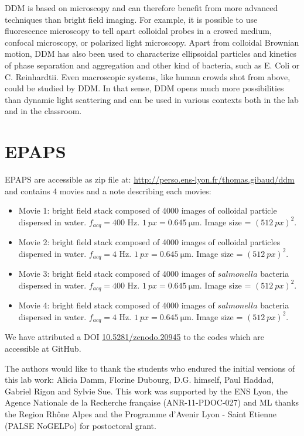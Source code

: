 \documentclass[prb,reprint,amsmath,amssymb]{revtex4-1}
\newcommand{\tg}[1]{{\color{magenta}#1}} %
\begin{document}
DDM is based  on microscopy and can therefore benefit from  more advanced techniques than bright field imaging. For example, it is possible to use fluorescence microscopy to tell apart colloidal probes in a crowed medium\cite{Hendricks2015}, confocal microscopy\cite{Lu2012}, or polarized light microscopy\citep{20_reufer2012differential}. Apart from colloidal Brownian motion, DDM has also been used to characterize ellipsoidal particles\citep{20_reufer2012differential} and kinetics of phase separation\cite{Gao2015} and aggregation\cite{Ferri2011} \tg{and other kind of bacteria, such as E. Coli or C. Reinhardtii\cite{4_Martinez20121637}}. Even macroscopic systems, like human crowds shot from above, could be studied by DDM. In that sense, DDM opens much more possibilities than dynamic light scattering and can be used in various contexts both in the lab and in the classroom.

\section*{EPAPS}
\label{sec:epaps}
EPAPS are accessible as zip file at: \url{http://perso.ens-lyon.fr/thomas.gibaud/ddm} and  contains 4 movies and a note describing each movies:
\begin{itemize}
 \item Movie 1: bright field stack composed of 4000 images of colloidal particle dispersed in water. $f_{acq}=400$ Hz. $\SI{1}{px} = \SI{0.645}{\micro\meter}$. Image size = $(\SI{512}{px})^2$.
 \item Movie 2: bright field stack composed of 4000 images of colloidal particles dispersed in water. $f_{acq}=4$ Hz. $\SI{1}{px} = \SI{0.645}{\micro\meter}$. Image size = $(\SI{512}{px})^2$.
 \item Movie 3: bright field stack composed of 4000 images of $salmonella$ bacteria dispersed in water. $f_{acq}=400$ Hz. $\SI{1}{px} = \SI{0.645}{\micro\meter}$. Image size = $(\SI{512}{px})^2$.
 \item Movie 4: bright field stack composed of 4000 images of $salmonella$ bacteria dispersed in water. $f_{acq}=4$ Hz. $\SI{1}{px} = \SI{0.645}{\micro\meter}$. Image size = $(\SI{512}{px})^2$.
\end{itemize}

We have attributed a DOI \href{http://dx.doi.org/10.5281/zenodo.20945}{10.5281/zenodo.20945}\cite{code_github} to the codes which are accessible at GitHub.


\begin{acknowledgments}
The authors would like to thank the students who endured the initial versions of this lab work: Alicia Damm, Florine Dubourg, D.G. himself, Paul Haddad, Gabriel Rigon and Sylvie Sue. 
This work was supported by the ENS Lyon, the Agence Nationale de la Recherche fran\c{c}aise (ANR-11-PDOC-027) and ML thanks the Region Rh\^one Alpes and
the Programme d'Avenir Lyon - Saint Etienne (PALSE NoGELPo) for postoctoral grant.
\end{acknowledgments}



\end{document}
